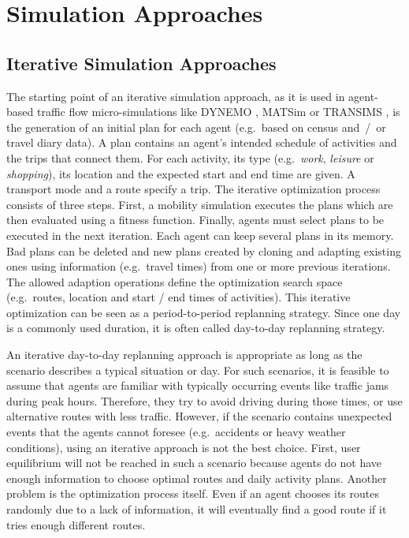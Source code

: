 \section{Simulation Approaches} \label{sec:SimulationApproaches}
\subsection{Iterative Simulation Approaches} \label{sec:IterativeSimulationApproaches}
The starting point of an iterative simulation approach, as it is used in agent-based traffic flow micro-simulations like DYNEMO \citep{Schwerdtfeger_VolmulerHamerslag_1984, NoekelSchmidt_NSE_2002}, MATSim \citep{Balmer_PhDThesis_2007, BalmerEtAl_HEUREKA_2008} or TRANSIMS \citep{SmithEtAl_NTRPAC_1995, NagelRickert_ParComp_2001},  is the generation of an initial plan for each agent (e.g.\ based on census and~/~or travel diary data). A plan contains an agent's intended schedule of activities and the trips that connect them. For each activity, its type (e.g.\ \emph{work}, \emph{leisure} or \emph{shopping}), its location and the expected start and end time are given. A transport mode and a route specify a trip. The iterative optimization process consists of three steps. First, a mobility simulation executes the plans which are then evaluated using a fitness function. Finally, agents must select plans to be executed in the next iteration. Each agent can keep several plans in its memory. Bad plans can be deleted and new plans created by cloning and adapting existing ones using information (e.g.\ travel times) from one or more previous iterations. The allowed adaption operations define the optimization search space (e.g.\ routes, location and start / end times of activities). This iterative optimization can be seen as a period-to-period replanning strategy. Since one day is a commonly used duration, it is often called day-to-day replanning strategy.

An iterative day-to-day replanning approach is appropriate as long as the scenario describes a typical situation or day. For such scenarios, it is feasible to assume that agents are familiar with typically occurring events like traffic jams during peak hours. Therefore, they try to avoid driving during those times, or use alternative routes with less traffic. However, if the scenario contains unexpected events that the agents cannot foresee (e.g.\ accidents or heavy weather conditions), using an iterative approach is not the best choice. First, user equilibrium will not be reached in such a scenario because agents do not have enough information to choose optimal routes and daily activity plans. Another problem is the optimization process itself. Even if an agent chooses its routes randomly due to a lack of information, it will eventually find a good route if it tries enough different routes.

